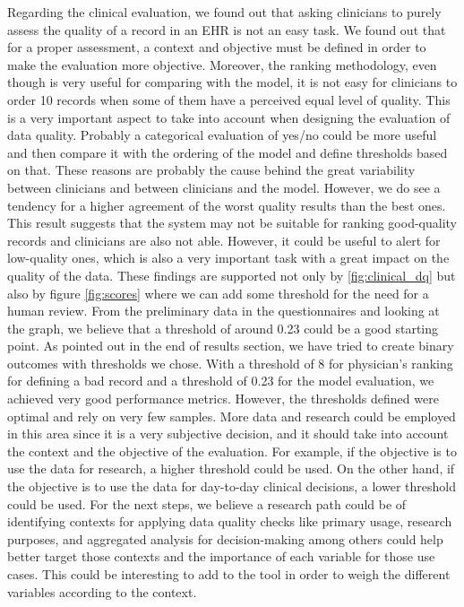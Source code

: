 Regarding the clinical evaluation, we found out that asking clinicians to purely assess the quality of a record in an EHR is not an easy task. We found out that for a proper assessment, a context and objective must be defined in order to make the evaluation more objective. Moreover, the ranking methodology, even though is very useful for comparing with the model, it is not easy for clinicians to order 10 records when some of them have a perceived equal level of quality. This is a very important aspect to take into account when designing the evaluation of data quality. Probably a categorical evaluation of yes/no could be more useful and then compare it with the ordering of the model and define thresholds based on that. These reasons are probably the cause behind the great variability between clinicians and between clinicians and the model. However, we do see a tendency for a higher agreement of the worst quality results than the best ones. This result suggests that the system may not be suitable for ranking good-quality records and clinicians are also not able. However, it could be useful to alert for low-quality ones, which is also a very important task with a great impact on the quality of the data. These findings are supported not only by \ref{fig:clinical_dq} but also by figure \ref{fig:scores} where we can add some threshold for the need for a human review. From the preliminary data in the questionnaires and looking at the graph, we believe that a threshold of around 0.23 could be a good starting point. As pointed out in the end of results section, we have tried to create binary outcomes with thresholds we chose. With a threshold of 8 for physician's ranking for defining a bad record and a threshold of 0.23 for the model evaluation, we achieved very good performance metrics. However, the thresholds defined were optimal and rely on very few samples. More data and research could be employed in this area since it is a very subjective decision, and it should take into account the context and the objective of the evaluation. For example, if the objective is to use the data for research, a higher threshold could be used. On the other hand, if the objective is to use the data for day-to-day clinical decisions, a lower threshold could be used.
For the next steps, we believe a research path could be of identifying contexts for applying data quality checks like primary usage, research purposes, and aggregated analysis for decision-making among others could help better target those contexts and the importance of each variable for those use cases. This could be interesting to add to the tool in order to weigh the different variables according to the context.